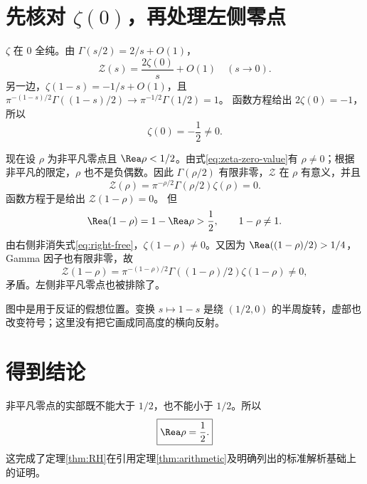 \section{先核对 \texorpdfstring{$\zeta(0)$}{ζ(0)}，再处理左侧零点}
$\zeta$ 在 $0$ 全纯。由 $\Gamma(s/2)=2/s+O(1)$，
\[
\mathcal Z(s)=\frac{2\zeta(0)}s+O(1)\quad(s\to0).
\]
另一边，$\zeta(1-s)=-1/s+O(1)$，且
$\pi^{-(1-s)/2}\Gamma((1-s)/2)\to\pi^{-1/2}\Gamma(1/2)=1$。
函数方程给出 $2\zeta(0)=-1$，所以
\begin{equation}
\zeta(0)=-\frac12\ne0.
\label{eq:zeta-zero-value}
\end{equation}

现在设 $\rho$ 为非平凡零点且 $\Rea\rho<1/2$。由式\eqref{eq:zeta-zero-value}有 $\rho\ne0$；根据非平凡的限定，$\rho$ 也不是负偶数。因此 $\Gamma(\rho/2)$ 有限非零，$\mathcal Z$ 在 $\rho$ 有意义，并且
\[
\mathcal Z(\rho)=\pi^{-\rho/2}\Gamma(\rho/2)\zeta(\rho)=0.
\]
函数方程于是给出 $\mathcal Z(1-\rho)=0$。
但
\[
\Rea(1-\rho)=1-\Rea\rho>\frac12,
\qquad 1-\rho\ne1.
\]
由右侧非消失式\eqref{eq:right-free}，$\zeta(1-\rho)\ne0$。又因为
$\Rea((1-\rho)/2)>1/4$，Gamma 因子也有限非零，故
\[
\mathcal Z(1-\rho)=
\pi^{-(1-\rho)/2}\Gamma((1-\rho)/2)\zeta(1-\rho)\ne0,
\]
矛盾。左侧非平凡零点也被排除了。

\begin{center}
\end{center}
图中是用于反证的假想位置。变换 $s\mapsto1-s$ 是绕 $(1/2,0)$ 的半周旋转，虚部也改变符号；这里没有把它画成同高度的横向反射。

\section{得到结论}
非平凡零点的实部既不能大于 $1/2$，也不能小于 $1/2$。所以
\[
\boxed{\Rea\rho=\frac12.}
\]
这完成了定理\ref{thm:RH}在引用定理\ref{thm:arithmetic}及明确列出的标准解析基础上的证明。

